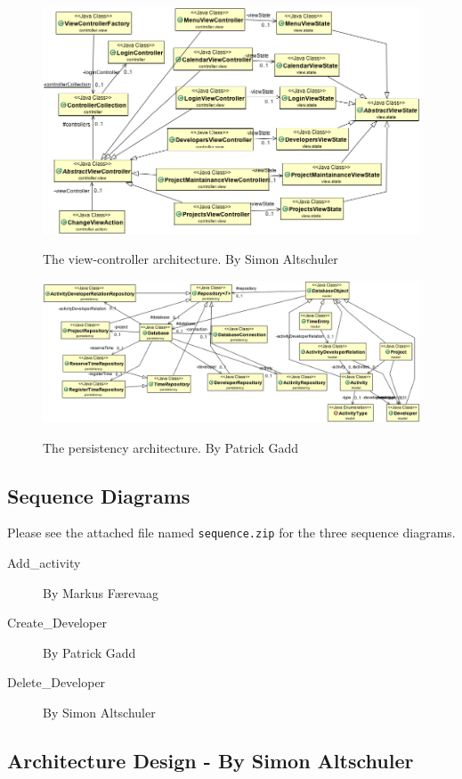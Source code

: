 \documentclass[danish]{article}
\newcommand{\code}[1]{\texttt{#1}}
\begin{document}
\begin{figure}[H]
  \centering
  \includegraphics[width=15cm]{uml/controller-simple-uml.png}
  \label{fig:vc_uml}
  \caption{The view-controller architecture. By Simon Altschuler}
\end{figure}


\begin{figure}[H]
  \centering
  \includegraphics[width=15cm]{uml/model-persistency-simple-uml.png}
  \label{fig:persistency_uml}
  \caption{The persistency architecture. By Patrick Gadd}
\end{figure}

\subsection{Sequence Diagrams}
Please see the attached file named \code{sequence.zip} for the three sequence diagrams. 
\begin{description}
\item[Add\_activity] By Markus Færevaag
\item[Create\_Developer] By Patrick Gadd
\item[Delete\_Developer] By Simon Altschuler
\end{description}

\subsection{Architecture Design - By Simon Altschuler}

\end{document}
